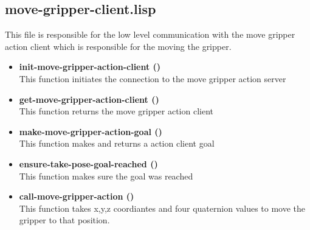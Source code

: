 \documentclass[main.tex]{subfiles}
\begin{document}
		\subsection{move-gripper-client.lisp}
		This file is responsible for the low level communication with the
		move gripper action client which is responsible for the moving the gripper.
		\begin{itemize}
			\item \textbf{init-move-gripper-action-client ()} \\
			This function initiates the connection to the move gripper action server
			\item \textbf{get-move-gripper-action-client ()} \\
			This function returns the move gripper action client
			\item \textbf{make-move-gripper-action-goal ()} \\
			This function makes and returns a action client goal
			\item \textbf{ensure-take-pose-goal-reached ()} \\
            This function makes sure the goal was reached
			\item \textbf{call-move-gripper-action ()} \\
			This function takes x,y,z coordiantes and four quaternion values to move the gripper to that position. 
		\end{itemize}
\end{document}
